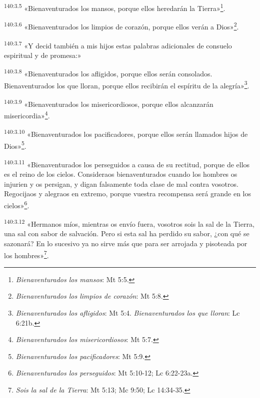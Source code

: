 \par
\textsuperscript{140:3.5} «Bienaventurados los mansos, porque ellos heredarán la Tierra»\footnote{\textit{Bienaventurados los mansos}: Mt 5:5.}.

\par
\textsuperscript{140:3.6} «Bienaventurados los limpios de corazón, porque ellos verán a Dios»\footnote{\textit{Bienaventurados los limpios de corazón}: Mt 5:8.}.

\par
\textsuperscript{140:3.7} «Y decid también a mis hijos estas palabras adicionales de consuelo espiritual y de promesa:»

\par
\textsuperscript{140:3.8} «Bienaventurados los afligidos, porque ellos serán consolados. Bienaventurados los que lloran, porque ellos recibirán el espíritu de la alegría»\footnote{\textit{Bienaventurados los afligidos}: Mt 5:4. \textit{Bienaventurados los que lloran}: Lc 6:21b.}.

\par
\textsuperscript{140:3.9} «Bienaventurados los misericordiosos, porque ellos alcanzarán misericordia»\footnote{\textit{Bienaventurados los misericordiosos}: Mt 5:7.}.

\par
\textsuperscript{140:3.10} «Bienaventurados los pacificadores, porque ellos serán llamados hijos de Dios»\footnote{\textit{Bienaventurados los pacificadores}: Mt 5:9.}.

\par
\textsuperscript{140:3.11} «Bienaventurados los perseguidos a causa de su rectitud, porque de ellos es el reino de los cielos. Consideraos bienaventurados cuando los hombres os injurien y os persigan, y digan falsamente toda clase de mal contra vosotros. Regocijaos y alegraos en extremo, porque vuestra recompensa será grande en los cielos»\footnote{\textit{Bienaventurados los perseguidos}: Mt 5:10-12; Lc 6:22-23a.}.

\par
\textsuperscript{140:3.12} «Hermanos míos, mientras os envío fuera, vosotros sois la sal de la Tierra, una sal con sabor de salvación. Pero si esta sal ha perdido su sabor, ¿con qué se sazonará? En lo sucesivo ya no sirve más que para ser arrojada y pisoteada por los hombres»\footnote{\textit{Sois la sal de la Tierra}: Mt 5:13; Mc 9:50; Lc 14:34-35.}.


